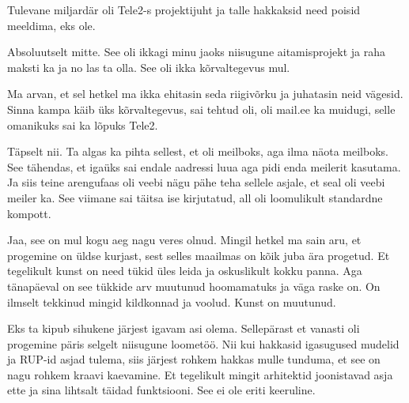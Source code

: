 Tulevane miljardär oli Tele2-s projektijuht ja talle 
hakkaksid need poisid meeldima, eks ole. 


Absoluutselt mitte. See oli ikkagi minu jaoks niisugune aitamisprojekt ja raha 
maksti ka ja no las ta olla. See  oli ikka  kõrvaltegevus mul.


Ma arvan, et sel hetkel ma ikka ehitasin seda riigivõrku ja juhatasin neid 
vägesid. Sinna kampa käib üks  kõrvaltegevus, sai tehtud oli, oli 
mail.ee ka muidugi, selle omanikuks sai ka lõpuks Tele2. 



Täpselt nii. Ta algas ka pihta sellest, et oli meilboks, aga ilma näota 
meilboks. See tähendas, et igaüks sai endale aadressi luua aga  pidi  enda 
meilerit  kasutama. Ja siis teine arengufaas oli veebi nägu pähe teha sellele  
asjale, et seal oli veebi meiler ka. See viimane sai täitsa ise kirjutatud, all 
oli loomulikult standardne kompott. 


Jaa, see on mul kogu aeg nagu veres olnud. Mingil hetkel ma sain aru, et  
progemine  on üldse kurjast, sest selles maailmas on kõik juba ära progetud. Et 
tegelikult  kunst on need tükid üles leida ja oskuslikult kokku panna. Aga 
tänapäeval on see tükkide arv muutunud hoomamatuks ja väga raske on.  On 
ilmselt tekkinud mingid kildkonnad ja voolud. Kunst on muutunud.


Eks ta kipub sihukene järjest igavam asi olema. Sellepärast et vanasti oli 
progemine päris selgelt  niisugune loometöö. Nii kui hakkasid igasugused 
mudelid ja RUP-id asjad tulema, siis 
järjest rohkem hakkas mulle tunduma, et see on nagu rohkem kraavi kaevamine. Et 
tegelikult mingit arhitektid joonistavad asja ette ja sina lihtsalt täidad 
funktsiooni. See ei ole eriti keeruline. 

